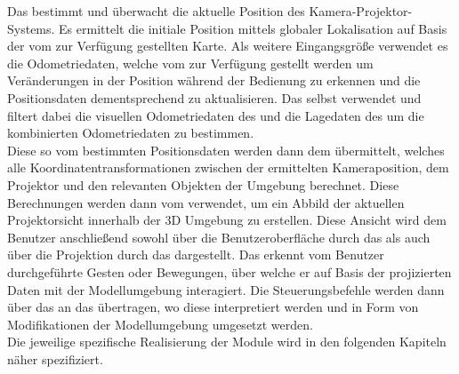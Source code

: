 Das \mLocalization bestimmt und überwacht die aktuelle Position des Kamera-Projektor-Systems. Es ermittelt die initiale Position mittels globaler Lokalisation auf Basis der vom \mMapserver zur Verfügung gestellten Karte. Als weitere Eingangsgröße verwendet es die Odometriedaten, welche vom \mEkf zur Verfügung gestellt werden um Veränderungen in der Position während der Bedienung zu erkennen und die Positionsdaten dementsprechend zu aktualisieren. Das \mEkf selbst verwendet und filtert dabei die visuellen Odometriedaten des \mFovis und die Lagedaten des \mImu {} um die kombinierten Odometriedaten zu bestimmen.\\
Diese so vom \mLocalization bestimmten Positionsdaten werden dann dem \mTransformation übermittelt, welches alle Koordinatentransformationen zwischen der ermittelten Kameraposition, dem Projektor und den relevanten Objekten der Umgebung berechnet. Diese Berechnungen werden dann vom \mVisualization verwendet, um ein Abbild der aktuellen Projektorsicht innerhalb der 3D Umgebung zu erstellen. Diese Ansicht wird dem Benutzer anschließend sowohl über die Benutzeroberfläche durch das \mGui als auch über die Projektion durch das \mProjection dargestellt. Das \mInteraction erkennt vom Benutzer durchgeführte Gesten oder Bewegungen, über welche er auf Basis der projizierten Daten mit der Modellumgebung interagiert. Die Steuerungsbefehle werden dann über das \mTransformation an das \mVisualization übertragen, wo diese interpretiert werden und in Form von Modifikationen der Modellumgebung umgesetzt werden.\\
Die jeweilige spezifische Realisierung der Module wird in den folgenden Kapiteln näher spezifiziert.\\

